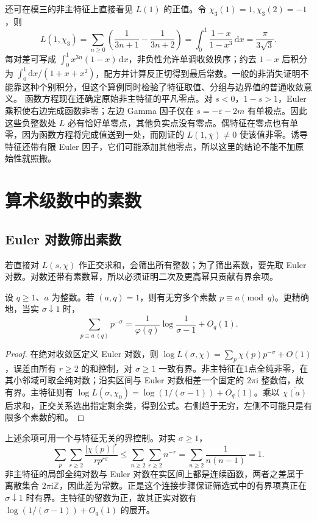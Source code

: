 还可在模三的非主特征上直接看见 \(L(1)\) 的正值。令 \(\chi_3(1)=1,\chi_3(2)=-1\)，则
\[
 L(1,\chi_3)=\sum_{n\ge0}\left(\frac1{3n+1}-\frac1{3n+2}\right)
 =\int_0^1\frac{1-x}{1-x^3}\,\mathrm{d}x
 =\frac\pi{3\sqrt3}.
\]
每对差可写成 \(\int_0^1x^{3n}(1-x)\,\mathrm{d}x\)，非负性允许单调收敛换序；约去 \(1-x\) 后积分为 \(\int_0^1\mathrm{d}x/(1+x+x^2)\)，配方并计算反正切得到最后常数。一般的非消失证明不能靠这种个别积分，但这个算例同时检验了特征取值、分组与边界值的普通收敛意义。
\ProseParagraphBreak
函数方程现在还确定原始非主特征的平凡零点。对 \(s<0\)，\(1-s>1\)，Euler 乘积使右边完成函数非零；左边 Gamma 因子仅在 \(s=-\varepsilon-2m\) 有单极点。因此这些负整数处 \(L\) 必有恰好单零点，其他负实点没有零点。偶特征在零点也有单零，因为函数方程将完成值送到一处，而刚证的 \(L(1,\bar\chi)\ne0\) 使该值非零。诱导特征还带有限 Euler 因子，它们可能添加其他零点，所以这里的结论不能不加原始性就照搬。


\section{算术级数中的素数}
\label{b3:sec:D04}

\subsection{Euler 对数筛出素数}
\label{b3:subsec:D0401}

若直接对 \(L(s,\chi)\) 作正交求和，会筛出所有整数；为了筛出素数，要先取 Euler 对数。对数还带有素数幂，所以必须证明二次及更高幂只贡献有界余项。

\begin{theorem}\label{b3:thm:D-dirichlet}
设 \(q\ge1\)、\(a\) 为整数。若 \((a,q)=1\)，则有无穷多个素数 \(p\equiv a\pmod q\)。更精确地，当实 \(\sigma\downarrow1\) 时，
\[
 \sum_{p\equiv a\ (q)}p^{-\sigma}
 =\frac1{\varphi(q)}\log\frac1{\sigma-1}+O_q(1).
\]
\end{theorem}
\begin{proof}
在绝对收敛区定义 Euler 对数，则
\(\log L(\sigma,\chi)=\sum_p\chi(p)p^{-\sigma}+O(1)\)，误差由所有 \(r\ge2\) 的和控制，对 \(\sigma\ge1\) 一致有界。非主特征在1点全纯非零，在其小邻域可取全纯对数；沿实区间与 Euler 对数相差一个固定的 \(2\pi\mathrm{i}\) 整数倍，故有界。主特征则有
\(\log L(\sigma,\chi_0)=\log(1/(\sigma-1))+O_q(1)\)。乘以 \(\overline{\chi(a)}\) 后求和，正交关系选出指定剩余类，得到公式。右侧趋于无穷，左侧不可能只是有限多个素数的和。
\end{proof}
上述余项可用一个与特征无关的界控制。对实 \(\sigma\ge1\)，
\[
 \sum_p\sum_{r\ge2}\frac{|\chi(p)|^r}{r p^{r\sigma}}
 \le \sum_{n\ge2}\sum_{r\ge2}n^{-r}
 =\sum_{n\ge2}\frac1{n(n-1)}=1.
\]
非主特征的局部全纯对数与 Euler 对数在实区间上都是连续函数，两者之差属于离散集合 \(2\pi\mathrm{i}\mathbb Z\)，因此差为常数。正是这个连接步骤保证筛选式中的有界项真正在 \(\sigma\downarrow1\) 时有界。主特征的留数为正，故其正实对数有 \(\log(1/(\sigma-1))+O_q(1)\) 的展开。

